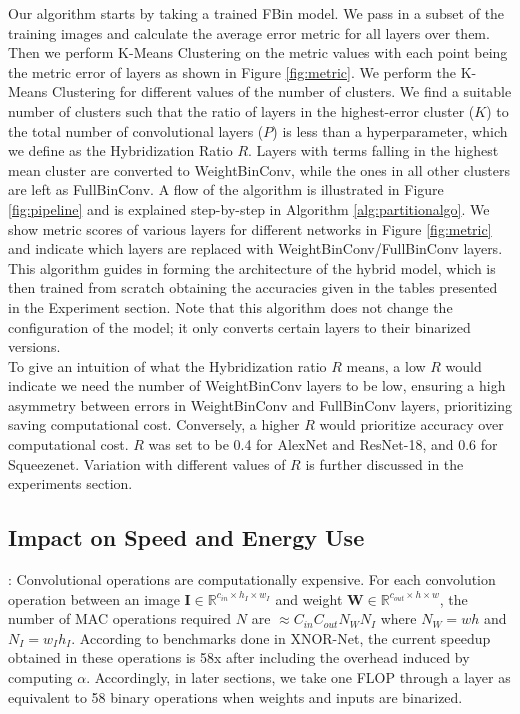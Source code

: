 \noindent Our algorithm starts by taking a trained FBin model. We pass in a subset of the training images and calculate the average error metric for all layers over them. Then we perform K-Means Clustering on the metric values with each point being the metric error of layers as shown in Figure \ref{fig:metric}. We perform the K-Means Clustering for different values of the number of clusters. We find a suitable number of clusters such that the ratio of layers in the highest-error cluster ($K$) to the total number of convolutional layers ($P$) is less than a hyperparameter, which we define as the Hybridization Ratio $R$. Layers with terms falling in the highest mean cluster are converted to WeightBinConv, while the ones in all other clusters are left as FullBinConv. A flow of the algorithm is illustrated in Figure \ref{fig:pipeline} and is explained step-by-step in Algorithm \ref{alg:partitionalgo}. We show metric scores of various layers for different networks in Figure \ref{fig:metric} and indicate which layers are replaced with WeightBinConv/FullBinConv layers. This algorithm guides in forming the architecture of the hybrid model, which is then trained from scratch obtaining the accuracies given in the tables presented in the Experiment section. Note that this algorithm does not change the configuration of the model; it only converts certain layers to their binarized versions.\\

\noindent To give an intuition of what the Hybridization ratio $R$ means, a low $R$ would indicate we need the number of WeightBinConv layers to be low, ensuring a high asymmetry between errors in WeightBinConv and FullBinConv layers, prioritizing saving computational cost. Conversely, a higher $R$ would prioritize accuracy over computational cost. $R$ was set to be 0.4 for AlexNet and ResNet-18, and 0.6 for Squeezenet. Variation with different values of $R$ is further discussed in the experiments section.

\subsection{Impact on Speed and Energy Use}
: Convolutional operations are computationally expensive. For each convolution operation between an image $\mathbf{I} \in \mathbb{R}^{c_{in} \times h_I \times w_I}$ and weight $\mathbf{W} \in \mathbb{R}^{c_{out} \times h \times w}$, the number of MAC operations required $N$ are $\approx C_{in}C_{out}N_WN_I$ where $N_W = wh$ and $N_I = w_Ih_I$. According to benchmarks done in XNOR-Net, the current speedup obtained in these operations is 58x after including the overhead induced by computing $\alpha$. Accordingly, in later sections, we take one FLOP through a layer as equivalent to 58 binary operations when weights and inputs are binarized. \\ 

